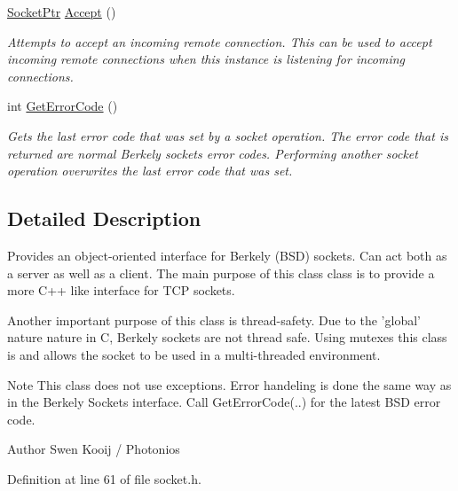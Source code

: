 \begin{DoxyCompactItemize}
\hyperlink{class_senergy_1_1_networking_1_1_socket_a19cb724ef153aebdbcc66cd4c3c4952a}{Socket\-Ptr} \hyperlink{class_senergy_1_1_networking_1_1_socket_a7796c8d13c593c99384a4ba7b54a2756}{Accept} ()
\begin{DoxyCompactList}\small\item\em Attempts to accept an incoming remote connection. This can be used to accept incoming remote connections when this instance is listening for incoming connections. \end{DoxyCompactList}\item 
int \hyperlink{class_senergy_1_1_networking_1_1_socket_af41c4b3448f3f7aff3dcc3b3580b6c1a}{Get\-Error\-Code} ()
\begin{DoxyCompactList}\small\item\em Gets the last error code that was set by a socket operation. The error code that is returned are normal Berkely sockets error codes. Performing another socket operation overwrites the last error code that was set. \end{DoxyCompactList}\end{DoxyCompactItemize}


\subsection{Detailed Description}
Provides an object-\/oriented interface for Berkely (B\-S\-D) sockets. Can act both as a server as well as a client. The main purpose of this class class is to provide a more C++ like interface for T\-C\-P sockets. 

Another important purpose of this class is thread-\/safety. Due to the 'global' nature nature in C, Berkely sockets are not thread safe. Using mutexes this class is and allows the socket to be used in a multi-\/threaded environment.

\begin{DoxyNote}{Note}
This class does not use exceptions. Error handeling is done the same way as in the Berkely Sockets interface. Call Get\-Error\-Code(..) for the latest B\-S\-D error code.
\end{DoxyNote}
\begin{DoxyAuthor}{Author}
Swen Kooij / Photonios 
\end{DoxyAuthor}


Definition at line 61 of file socket.\-h.



